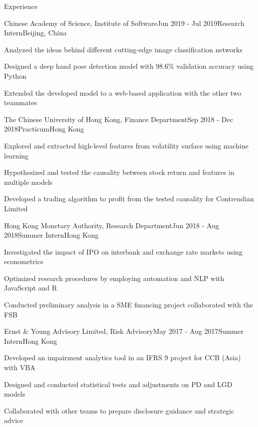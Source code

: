 \documentclass{resume} %
\begin{document}
\begin{rSection}{Experience}

\begin{rSubsection}{Chinese Academy of Science, Institute of Software}{Jun 2019 - Jul 2019}{Research Intern}{Beijing, China}
\item Analyzed the ideas behind different cutting-edge image classification networks
\item Designed a deep hand pose detection model with 98.6\% validation accuracy using Python
\item Extended the developed model to a web-based application with the other two teammates
\end{rSubsection}


\begin{rSubsection}{The Chinese University of Hong Kong, Finance Department}{Sep 2018 - Dec 2018}{Practicum}{Hong Kong}
\item Explored and extracted high-level features from volatility surface using machine learning
\item Hypothesized and tested the causality between stock return and features in multiple models
\item Developed a trading algorithm to profit from the tested causality for Contrendian Limited
\end{rSubsection}


\begin{rSubsection}{Hong Kong Monetary Authority, Research Department}{Jun 2018 - Aug 2018}{Summer Intern}{Hong Kong}
\item Investigated the impact of IPO on interbank and exchange rate markets using econometrics
\item Optimized research procedures by employing automation and NLP with JavaScript and R
\item Conducted preliminary analysis in a SME financing project collaborated with the FSB
\end{rSubsection}


\begin{rSubsection}{Ernst \& Young Advisory Limited, Risk Advisory}{May 2017 - Aug 2017}{Summer Intern}{Hong Kong}
\item Developed an impairment analytics tool in an IFRS 9 project for CCB (Asia) with VBA
\item Designed and conducted statistical tests and adjustments on PD and LGD models
\item Collaborated with other teams to prepare disclosure guidance and strategic advice
\end{rSubsection}

\end{rSection}
\end{document}
